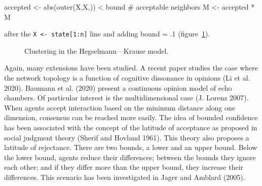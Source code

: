 \documentclass[
  a4paper,
  DIV=11,
  numbers=noendperiod,
  oneside]{scrreprt}
\newenvironment{Shaded}{}{}
\newcommand{\CommentTok}[1]{\textcolor[rgb]{0.42,0.45,0.49}{#1}}
\newcommand{\FunctionTok}[1]{\textcolor[rgb]{0.44,0.26,0.76}{#1}}
\newcommand{\NormalTok}[1]{\textcolor[rgb]{0.14,0.16,0.18}{#1}}
\newcommand{\OtherTok}[1]{\textcolor[rgb]{0.44,0.26,0.76}{#1}}
\newcommand{\SpecialCharTok}[1]{\textcolor[rgb]{0.00,0.36,0.77}{#1}}
\newcommand{\StringTok}[1]{\textcolor[rgb]{0.01,0.18,0.38}{#1}}
\begin{document}
\begin{Shaded}
\begin{Highlighting}[]
\NormalTok{accepted }\OtherTok{\textless{}{-}} \FunctionTok{abs}\NormalTok{(}\FunctionTok{outer}\NormalTok{(X,X,}\StringTok{\textquotesingle{}{-}\textquotesingle{}}\NormalTok{)) }\SpecialCharTok{\textless{}}\NormalTok{ bound }\CommentTok{\# acceptable neighbors}
\NormalTok{M }\OtherTok{\textless{}{-}}\NormalTok{ accepted }\SpecialCharTok{*}\NormalTok{ M}
\end{Highlighting}
\end{Shaded}

after the \texttt{X\ \textless{}-\ state{[}1:n{]}} line and adding bound
= .1 (figure~\ref{fig-ch7-img9-old-97}).

\begin{figure}


\caption{\label{fig-ch7-img9-old-97}Clustering in the
Hegselmann---Krause model.}

\end{figure}%

Again, many extensions have been studied. A recent paper studies the
case where the network topology is a function of cognitive dissonance in
opinions (Li et al. 2020). Baumann et al. (2020) present a continuous
opinion model of echo chambers. Of particular interest is the
multidimensional case (J. Lorenz 2007). When agents accept interaction
based on the minimum distance along one dimension, consensus can be
reached more easily. The idea of bounded confidence has been associated
with the concept of the latitude of acceptance as proposed in social
judgment theory (Sherif and Hovland 1961). This theory also proposes a
latitude of rejectance. There are two bounds, a lower and an upper
bound. Below the lower bound, agents reduce their differences; between
the bounds they ignore each other; and if they differ more than the
upper bound, they increase their differences. This scenario has been
investigated in Jager and Amblard (2005).
\end{document}

